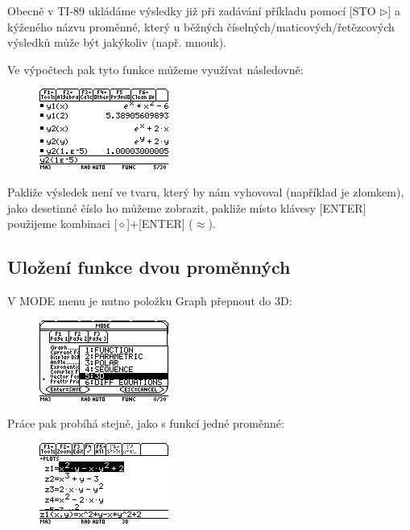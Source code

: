 \documentclass[10pt,a4paper,float]{article}
\begin{document}
Obecně v TI-89 ukládáme výsledky již při zadávání příkladu pomocí [STO $\triangleright$] a kýženého názvu proměnné, který u běžných číselných/maticových/řetězcových výsledků může být jakýkoliv (např. mnouk).

Ve výpočtech pak tyto funkce můžeme využívat následovně:

\begin{figure}[H]
	\centering
	\includegraphics[width=.5\textwidth]{img/1FUNC_UZITI}
\end{figure}

Pakliže výsledek není ve tvaru, který by nám vyhovoval (například je zlomkem), jako desetinné číslo ho můžeme zobrazit, pakliže místo klávesy [ENTER] použijeme kombinaci [$\diamond$]+[ENTER] ($\approx$).

\pagebreak

\subsection{Uložení funkce dvou proměnných}
V MODE menu je nutno položku Graph přepnout do 3D:

\begin{figure}[H]
	\centering
	\includegraphics[width=.5\textwidth]{img/3D}
\end{figure}

Práce pak probíhá stejně, jako s funkcí jedné proměnné:

\begin{figure}[H]
	\centering
	\includegraphics[width=.5\textwidth]{img/2FUNC}
\end{figure}
\end{document}

